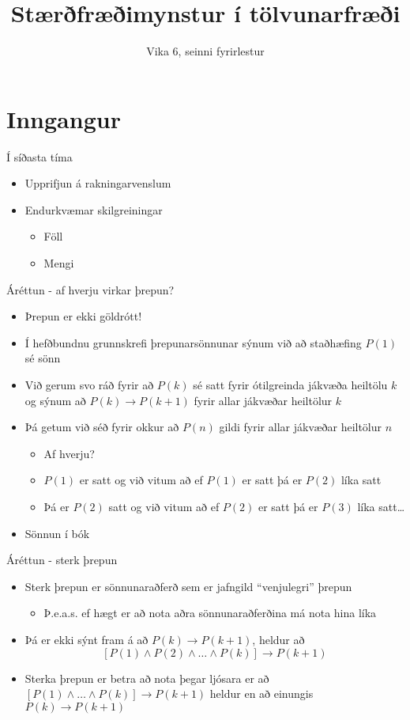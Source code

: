 \documentclass[handout]{beamer}
\title{Stærðfræðimynstur í tölvunarfræði}
\subtitle{Vika 6, seinni fyrirlestur}
\begin{document}
\begin{frame}
\titlepage
\end{frame}


\section{Inngangur}

\begin{frame}{Í síðasta tíma}
\begin{itemize}
 \item Upprifjun á rakningarvenslum
 \item Endurkvæmar skilgreiningar
 \begin{itemize}
  \item Föll
  \item Mengi
 \end{itemize}
\end{itemize}
\end{frame}

\begin{frame}{Áréttun - af hverju virkar þrepun?}
\begin{itemize}
 \item Þrepun er ekki göldrótt!
 \item Í hefðbundnu grunnskrefi þrepunarsönnunar sýnum við að staðhæfing $P(1)$ sé sönn
 \item Við gerum svo ráð fyrir að $P(k)$ sé satt fyrir ótilgreinda jákvæða heiltölu $k$ og sýnum að $P(k) \to P(k+1)$ fyrir allar jákvæðar heiltölur $k$
 \item Þá getum við séð fyrir okkur að $P(n)$ gildi fyrir allar jákvæðar heiltölur $n$
 \begin{itemize}
  \item Af hverju?
  \item $P(1)$ er satt og við vitum að ef $P(1)$ er satt þá er $P(2)$ líka satt
  \item Þá er $P(2)$ satt og við vitum að ef $P(2)$ er satt þá er $P(3)$ líka satt\ldots
 \end{itemize}
 \item Sönnun í bók
\end{itemize}
\end{frame}

\begin{frame}{Áréttun - sterk þrepun}
\begin{itemize}
 \item Sterk þrepun er sönnunaraðferð sem er jafngild ``venjulegri'' þrepun
 \begin{itemize}
  \item Þ.e.a.s. ef hægt er að nota aðra sönnunaraðferðina má nota hina líka
 \end{itemize}
 \item Þá er ekki sýnt fram á að $P(k) \to P(k+1)$, heldur að \[[P(1) \land P(2) \land \ldots \land P(k)] \to P(k+1)\]
 \item Sterka þrepun er betra að nota þegar ljósara er að $[P(1) \land \ldots \land P(k)] \to P(k+1)$ heldur en að einungis $P(k) \to P(k+1)$
\end{itemize}
\end{frame}
\end{document}
